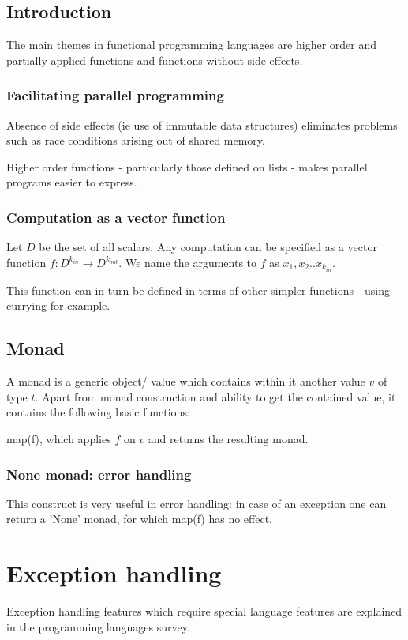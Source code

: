 \documentclass[oneside, article]{memoir}
\begin{document}
\subsection{Introduction}
The main themes in functional programming languages are higher order and partially applied functions and functions without side effects.

\subsubsection{Facilitating parallel programming}
Absence of side effects (ie use of immutable data structures) eliminates problems such as race conditions arising out of shared memory.

Higher order functions - particularly those defined on lists - makes parallel programs easier to express.

\subsubsection{Computation as a vector function}
Let $D$ be the set of all scalars. Any computation can be specified as a vector function $f:D^{k_{in}} \to D^{k_{out}}$. We name the arguments to $f$ as $x_1, x_2 .. x_{k_{in}}$.

This function can in-turn be defined in terms of other simpler functions - using currying for example.

\subsection{Monad}
A monad is a generic object/ value which contains within it another value $v$ of type $t$. Apart from monad construction and ability to get the contained value, it contains the following basic functions:

map(f), which applies $f$ on $v$ and returns the resulting monad.


\subsubsection{None monad: error handling}
This construct is very useful in error handling: in case of an exception one can return a 'None' monad, for which map(f) has no effect.

\section{Exception handling}
Exception handling features which require special language features are explained in the programming languages survey.
\end{document}
